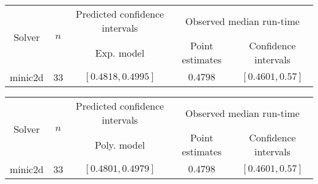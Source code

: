 \begin{tabular}{ccccc}
\hline 
\multirow{2}{*}{Solver} & \multirow{2}{*}{$n$} & Predicted confidence intervals & \multicolumn{2}{c}{Observed median  run-time}\tabularnewline
 &  & Exp. model  & Point estimates  & Confidence intervals\tabularnewline
\hline 
\hline 
\multirow{0}{*}{minic2d} & 33 & $\mathbf{\left[0.4818,0.4995\right]}$ & $0.4798$ & $\left[0.4601,0.57\right]$ \tabularnewline 
\hline 
\end{tabular} 

\begin{tabular}{ccccc}
\hline 
\multirow{2}{*}{Solver} & \multirow{2}{*}{$n$} & Predicted confidence intervals & \multicolumn{2}{c}{Observed median  run-time}\tabularnewline
 &  & Poly. model  & Point estimates  & Confidence intervals\tabularnewline
\hline 
\hline 
\multirow{0}{*}{minic2d} & 33 & $\mathbf{\left[0.4801,0.4979\right]}$ & $0.4798$ & $\left[0.4601,0.57\right]$ \tabularnewline 
\hline 
\end{tabular} 


